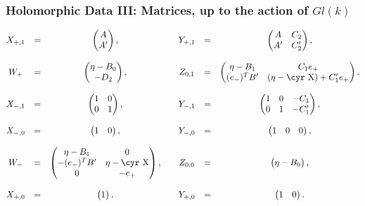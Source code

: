 \documentclass[12pt]{article}
\theoremstyle{definition}
\theoremstyle{remark}
\numberwithin{theorem}{section}
\newcommand{\Sh}{\hbox{\cyr X}}
\begin{document}
\subsubsection{Holomorphic Data III: Matrices, up to the action of $Gl(k)$}  
\begin{equation} 
\begin{matrix}
X_{+,1}&= & \begin{pmatrix}A\\A'\end{pmatrix},&&Y_{+,1}&=& \begin{pmatrix}A&C_{2}\\A'&C'_{2}\end{pmatrix},\\ \\
W_{+}&=& \begin{pmatrix}\eta-B_0\\-D_{2}\end{pmatrix},&&Z_{0,1} &=&\begin{pmatrix}\eta-B_{1}&C_{1}e_+\\ (e_-)^TB'&(\eta-\Sh)+C'_{1}e_+\end{pmatrix},\\ \\
X_{-,1}&=& \begin{pmatrix}1&0\\0&1\end{pmatrix},&& Y_{-,1}&=& \begin{pmatrix}1&0&-C_{1}\\0&1&-C'_{1}\end{pmatrix},\\ \\
X_{-,0}&=& \begin{pmatrix}1&0\end{pmatrix},&&Y_{-,0}&=& \begin{pmatrix}1&0&0\end{pmatrix},\\ \\
W_{-}&=& \begin{pmatrix}\eta-B_{1}&0\\ -(e_-)^TB'&\eta-\Sh\\0&-e_+ \end{pmatrix},&&Z_{0,0}&=&\begin{pmatrix}\eta-B_{0}\end{pmatrix},\\ \\
X_{+,0}&= &\begin{pmatrix}1 \end{pmatrix},&&Y_{+,0}&=& \begin{pmatrix}1&0\end{pmatrix}. 
\end{matrix}\label{matrices-TN}
\end{equation}
\end{document}
